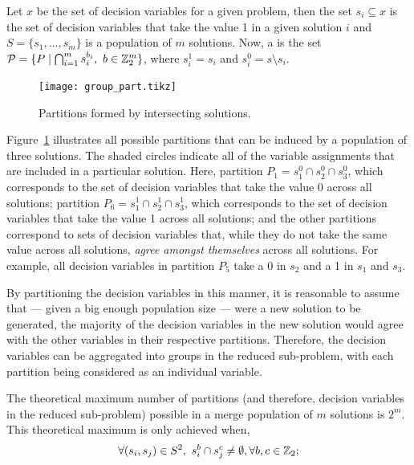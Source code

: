 \documentclass[journal]{IEEEtran}
\begin{document}
\begin{definition}\label{prop:part}
Let $x$ be the set of decision variables for a given problem, then the set $s_i \subseteq x$ is the set of decision variables that take the value 1 in a given solution $i$ and $S = \{s_1,\dots,s_m\}$ is a population of $m$ solutions. Now, a  is the set ${\cal P} = \{P \mid \bigcap_{i=1}^{m} s^{b_i}_i,\ b \in \Bin^m\}$, 
where $s_i^1 = s_i$ and $s_i^0 = s \setminus s_i$.
\end{definition}

\begin{figure}[h!]
\centering
\texttt{[image: group\_part.tikz]}
\caption[Partitions formed by intersecting solutions]{Partitions formed by intersecting solutions.}
\label{fig:group_part}
\end{figure}

Figure~\ref{fig:group_part} illustrates all possible partitions that can be induced by a population of three solutions. The shaded circles indicate all of the variable assignments that are included in a particular solution. Here, partition $P_1=s^0_1 \cap s^0_2 \cap s^0_3$, which corresponds to the set of decision variables that take the value 0 across all solutions; partition $P_6=s^1_1 \cap s^1_2 \cap s^1_3$, which corresponds to the set of decision variables that take the value 1 across all solutions; and the other partitions correspond to sets of decision variables that, while they do not take the same value across all solutions, \emph{agree amongst themselves} across all solutions. For example, all decision variables in partition $P_5$ take a 0 in $s_2$ and a 1 in $s_1$ and $s_3$.
 
By partitioning the decision variables in this manner, it is reasonable to assume that --- given a big enough population size --- were a new solution to be generated, the majority of the decision variables in the new solution would agree with the other variables in their respective partitions. Therefore, the decision variables can be aggregated into groups in the reduced sub-problem, with each partition being considered as an individual variable. 

The theoretical maximum number of partitions (and therefore, decision variables in the reduced sub-problem) possible in a merge population of $m$ solutions is $2^m$. This theoretical maximum is only achieved when,
\begin{equation*}
\forall (s_i,s_j) \in S^2,\ s^b_i \cap s^c_j \neq \emptyset, \forall b,c \in \Bin; \label{sec:merge:part:bound}
\end{equation*}
\end{document}
